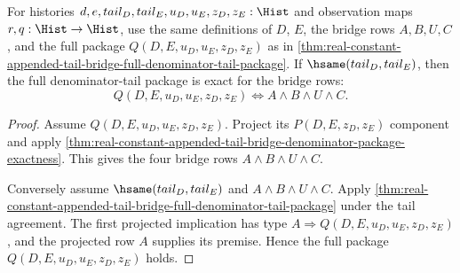 \begin{theorem}
\label{thm:real-constant-appended-tail-bridge-full-denominator-tail-package-exactness}
For histories $d,e,tail_D,tail_E,u_D,u_E,z_D,z_E:\Hist$ and observation maps
$r,q:\Hist\to\Hist$, use the same definitions of $D$, $E$, the bridge rows
$A,B,U,C$, and the full package $Q(D,E,u_D,u_E,z_D,z_E)$ as in
\autoref{thm:real-constant-appended-tail-bridge-full-denominator-tail-package}.
If $\hsame(tail_D,tail_E)$, then the full denominator-tail package is exact
for the bridge rows:
$$
Q(D,E,u_D,u_E,z_D,z_E)\Longleftrightarrow A\land B\land U\land C.
$$
\end{theorem}
\begin{proof}
Assume $Q(D,E,u_D,u_E,z_D,z_E)$. Project its
$P(D,E,z_D,z_E)$ component and apply
\autoref{thm:real-constant-appended-tail-bridge-denominator-package-exactness}.
This gives the four bridge rows $A\land B\land U\land C$.

Conversely assume $\hsame(tail_D,tail_E)$ and $A\land B\land U\land C$.
Apply
\autoref{thm:real-constant-appended-tail-bridge-full-denominator-tail-package}
under the tail agreement. The first projected implication has type
$A\Longrightarrow Q(D,E,u_D,u_E,z_D,z_E)$, and the projected row $A$ supplies
its premise. Hence the full package $Q(D,E,u_D,u_E,z_D,z_E)$ holds.
\end{proof}

